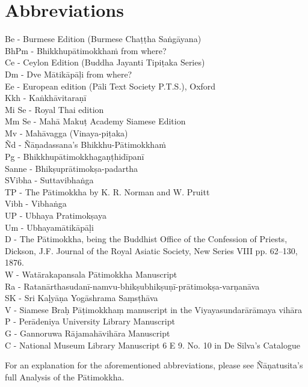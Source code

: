 
\chapter{Abbreviations}
\label{abbreviations}

{\raggedright

Be - Burmese Edition (Burmese Chaṭṭha Saṅgāyana)\\
BhPm - Bhikkhupātimokkhaṁ from where?\\
Ce - Ceylon Edition (Buddha Jayanti Tipiṭaka Series)\\
Dm - Dve Mātikāpāḷi from where?\\
Ee - European edition (Pāli Text Society P.T.S.), Oxford\\
Kkh - Kaṅkhāvitaraṇī\\
Mi Se - Royal Thai edition\\
Mm Se - Mahā Makuṭ Academy Siamese Edition\\
Mv - Mahāvagga (Vinaya-piṭaka)\\
Ñd - Ñāṇadassana's Bhikkhu-Pātimokkhaṁ\\
Pg - Bhikkhupātimokkhagaṇṭhidīpanī\\
Sanne - Bhikṣuprātimokṣa-padartha\\
SVibha - Suttavibhaṅga\\
TP - The Pātimokkha by K. R. Norman and W. Pruitt\\
Vibh - Vibhaṅga\\
UP - Ubhaya Pratimokṣaya\\
Um - Ubhayamātikāpāḷi\\
D - The Pātimokkha, being the Buddhist Office of the Confession of Priests, Dickson, J.F. Journal of the Royal Asiatic Society, New Series VIII pp. 62–130, 1876.\\
W - Watärakapansala Pātimokkha Manuscript\\
Ra - Ratanārthasudanī-namvu-bhikṣubhikṣuṇī-prātimokṣa-varṇanāva\\
SK - Sri Kaḷyāṇa Yogāshrama Saṃsṭhāva\\
V - Siamese Braḥ Pāṭimokkhaṃ manuscript in the Viyayasundarārāmaya vihāra\\
P - Perādeniya University Library Manuscript\\
G - Gannoruwa Rājamahāvihāra Manuscript\\
C - National Museum Library Manuscript 6 E 9. No. 10 in De Silva’s Catalogue\\

\smallskip

For an explanation for the aforementioned abbreviations, please see Ñāṇatusita's full Analysis of the Pātimokkha.
}

